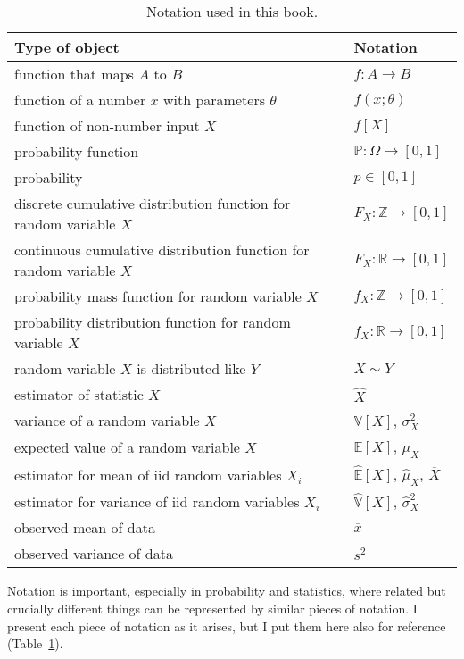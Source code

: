 \begin{table}
\centering
\begin{tabular}{ll}
\toprule
Type of object & Notation \\
\midrule
function that maps $A$ to $B$ & $f : A \to B$ \\
function of a number $x$ with parameters $\theta$ & $f(x; \theta)$ \\
function of non-number input $X$ & $f[X]$ \\
probability function & $\mathbb{P} : \Omega \to [0, 1]$ \\
probability & $p \in [0, 1]$ \\
discrete cumulative distribution function for random variable $X$ & $F_X : \mathbb{Z} \to [0, 1]$ \\
continuous cumulative distribution function for random variable $X$ & $F_X : \mathbb{R} \to [0, 1]$ \\
probability mass function for random variable $X$ & $f_X : \mathbb{Z} \to [0, 1]$ \\
probability distribution function for random variable $X$ & $f_X : \mathbb{R} \to [0, 1]$ \\
random variable $X$ is distributed like $Y$ & $X \sim Y$ \\
estimator of statistic $X$ & $\hat{X}$ \\
variance of a random variable $X$ & $\mathbb{V}[X]$, $\sigma_{X}^2$ \\
expected value of a random variable $X$ & $\mathbb{E}[X]$, $\mu_X$ \\
estimator for mean of iid random variables $X_i$ & $\hat{\mathbb{E}}[X]$, $\hat{\mu}_X$, $\overline{X}$ \\
estimator for variance of iid random variables $X_i$ & $\hat{\mathbb{V}}[X]$, $\hat{\sigma}_X^2$ \\
observed mean of data & $\overline{x}$ \\
observed variance of data & $s^2$ \\
\bottomrule
\end{tabular}
\caption{Notation used in this book.}
\label{tab:notation}
\end{table}

Notation is important, especially in probability and statistics, where related
but crucially different things can be represented by similar pieces of
notation. I present each piece of notation as it arises, but I put them here
also for reference (Table~\ref{tab:notation}).
